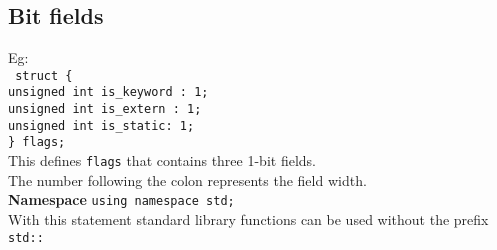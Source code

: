 \subsection{Bit fields}

Eg:\\
\texttt{
	struct \{\\
		\qquad unsigned int is\_keyword : 1;\\
		\qquad unsigned int is\_extern : 1;\\
		\qquad unsigned int is\_static: 1;\\
	\} flags;
}\\

This defines \texttt{flags} that contains three 1-bit fields.\\
The number following the colon represents the field width.\\

\textbf{Namespace}
\texttt{using namespace std;}\\
	With this statement standard library functions can be used without the prefix \texttt{std::}\\
